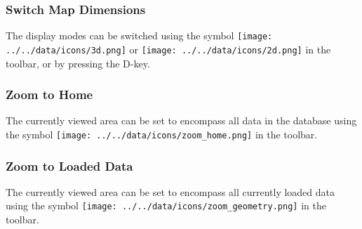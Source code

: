 \subsubsection{Switch Map Dimensions}

The display modes can be switched using the symbol \texttt{[image: ../../data/icons/3d.png]} or \texttt{[image: ../../data/icons/2d.png]} in the toolbar, or by pressing the D-key. 

\subsubsection{Zoom to Home}

The currently viewed area can be set to encompass all data in the database using the symbol \texttt{[image: ../../data/icons/zoom\_home.png]} in the toolbar.

\subsubsection{Zoom to Loaded Data}

The currently viewed area can be set to encompass all currently loaded data using the symbol \texttt{[image: ../../data/icons/zoom\_geometry.png]} in the toolbar.

